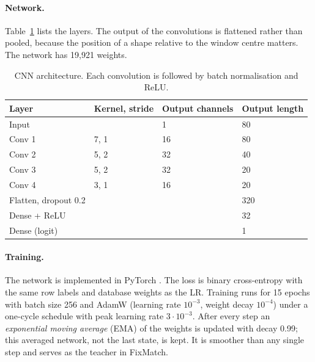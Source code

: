 \documentclass[11pt,a4paper]{article}
\begin{document}
\paragraph{Network.} Table~\ref{tab:net} lists the layers. The output of the convolutions is flattened rather than pooled, because the position of a shape relative to the window centre matters. The network has 19,921 weights.

\begin{table}[ht]
\centering
\caption{CNN architecture. Each convolution is followed by batch normalisation and ReLU.}
\label{tab:net}
\small
\begin{tabular}{llll}
\toprule
Layer & Kernel, stride & Output channels & Output length \\
\midrule
Input & & 1 & 80 \\
Conv 1 & 7, 1 & 16 & 80 \\
Conv 2 & 5, 2 & 32 & 40 \\
Conv 3 & 5, 2 & 32 & 20 \\
Conv 4 & 3, 1 & 16 & 20 \\
Flatten, dropout 0.2 & & & 320 \\
Dense + ReLU & & & 32 \\
Dense (logit) & & & 1 \\
\bottomrule
\end{tabular}
\end{table}

\paragraph{Training.} The network is implemented in PyTorch \cite{pytorch}. The loss is binary cross-entropy with the same row labels and database weights as the LR. Training runs for 15 epochs with batch size 256 and AdamW (learning rate $10^{-3}$, weight decay $10^{-4}$) under a one-cycle schedule with peak learning rate $3\cdot10^{-3}$. After every step an \emph{exponential moving average} (EMA) of the weights is updated with decay 0.99; this averaged network, not the last state, is kept. It is smoother than any single step and serves as the teacher in FixMatch.
\end{document}
